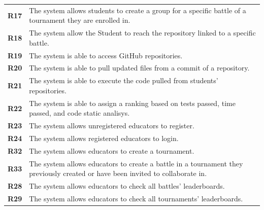 \documentclass[12pt, a4paper]{report}
\begin{document}
\begin{table}[H]
\begin{tabularx}{\textwidth}{cX}
        \textbf{R17} & The system allows students to create a group for a specific battle of a tournament they are enrolled in.                         \\
        \textbf{R18} & The system allow the Student to reach the repository linked to a specific battle.                                                \\
        \textbf{R19} & The system is able to access GitHub repositories.                                                                                \\
        \textbf{R20} & The system is able to pull updated files from a commit of a repository.                                                          \\
        \textbf{R21} & The system is able to execute the code pulled from students' repositories.                                                       \\
        \textbf{R22} & The system is able to assign a ranking based on tests passed, time passed, and code static analisys.                             \\
        \textbf{R23} & The system allows unregistered educators to register.                                                                            \\
        \textbf{R24} & The system allows registered educators to login.                                                                                 \\
        \textbf{R32} & The system allows educators to create a tournament.                                                                              \\
        \textbf{R33} & The system allows educators to create a battle in a tournament they previously created or have been invited to collaborate in.   \\
        \textbf{R28} & The system allows educators to check all battles' leaderboards.                                                                  \\
        \textbf{R29} & The system allows educators to check all tournaments' leaderboards.                                                              \\
        
        \end{tabularx}
    \end{table}
\end{document}
